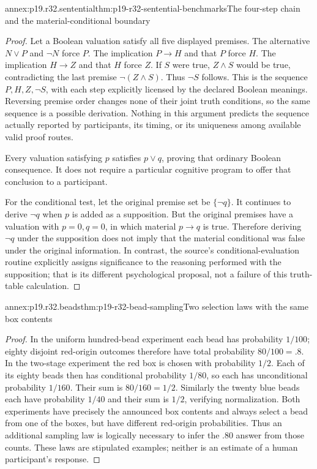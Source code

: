 \begin{annexitem}{annex:p19.r32.sentential}{thm:p19-r32-sentential-benchmarks}{The four-step chain and the material-conditional boundary}
\begin{proof}
Let a Boolean valuation satisfy all five displayed premises.
The alternative \(N\lor P\) and \(\neg N\) force \(P\).
The implication \(P\to H\) and that \(P\) force \(H\).
The implication \(H\to Z\) and that \(H\) force \(Z\).
If \(S\) were true, \(Z\land S\) would be true, contradicting
the last premise \(\neg(Z\land S)\). Thus \(\neg S\) follows.
This is the sequence \(P,H,Z,\neg S\), with each step explicitly
licensed by the declared Boolean meanings. Reversing premise order
changes none of their joint truth conditions, so the same sequence
is a possible derivation. Nothing in this argument predicts the
sequence actually reported by participants, its timing, or its
uniqueness among available valid proof routes.

Every valuation satisfying \(p\) satisfies \(p\lor q\), proving
that ordinary Boolean consequence. It does not require a particular
cognitive program to offer that conclusion to a participant.

For the conditional test, let the original premise set be
\(\{\neg q\}\). It continues to derive \(\neg q\) when \(p\)
is added as a supposition. But the original premises have a valuation
with \(p=0,q=0\), in which material \(p\to q\) is true.
Therefore deriving \(\neg q\) under the supposition does not imply
that the material conditional was false under the original information.
In contrast, the source's conditional-evaluation routine explicitly
assigns significance to the reasoning performed with the supposition;
that is its different psychological proposal, not a failure of this
truth-table calculation.
\end{proof}
\end{annexitem}

\begin{annexitem}{annex:p19.r32.beads}{thm:p19-r32-bead-sampling}{Two selection laws with the same box contents}
\begin{proof}
In the uniform hundred-bead experiment each bead has probability
\(1/100\); eighty disjoint red-origin outcomes therefore have
total probability \(80/100=.8\). In the two-stage experiment the
red box is chosen with probability \(1/2\). Each of its eighty beads
then has conditional probability \(1/80\), so each has unconditional
probability \(1/160\). Their sum is \(80/160=1/2\).
Similarly the twenty blue beads each have probability \(1/40\)
and their sum is \(1/2\), verifying normalization. Both experiments
have precisely the announced box contents and always select a bead
from one of the boxes, but have different red-origin probabilities.
Thus an additional sampling law is logically necessary to infer
the .80 answer from those counts. These laws are stipulated examples;
neither is an estimate of a human participant's response.
\end{proof}
\end{annexitem}

